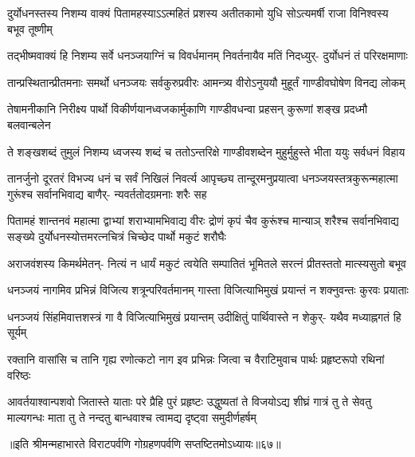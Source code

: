 
\fourlineindentedshloka
{दुर्योधनस्तस्य निशम्य वाक्यं}
{पितामहस्याऽऽत्महितं प्रशस्य}
{अतीतकामो युधि सोऽत्यमर्षी}
{राजा विनिश्वस्य बभूव तूष्णीम्}


\fourlineindentedshloka
{तद्भीष्मवाक्यं हि निशम्य सर्वे}
{धनञ्जयाग्निं च विवर्धमानम्}
{निवर्तनायैव मतिं निदध्युर्-}
{दुर्योधनं तं परिरक्षमाणाः}


\fourlineindentedshloka
{तान्प्रस्थितान्प्रीतमनाः समर्थो}
{धनञ्जयः सर्वकुरुप्रवीरः}
{आमन्त्र्य वीरोऽनुययौ मुहूर्तं}
{गाण्डीवघोषेण विनद्य लोकम्}


\fourlineindentedshloka
{तेषामनीकानि निरीक्ष्य पार्थो}
{विकीर्णयानध्वजकार्मुकाणि}
{गाण्डीवधन्वा प्रहसन् कुरूणां}
{शङ्ख प्रदध्मौ बलवान्बलेन}


\fourlineindentedshloka
{ते शङ्खशब्दं तुमुलं निशम्य}
{ध्वजस्य शब्दं च ततोऽन्तरिक्षे}
{गाण्डीवशब्देन मुहुर्मुहुस्ते}
{भीता ययुः सर्वधनं विहाय}


\sixlineindentedshloka
{तानर्जुनो दूरतरं विभज्य}
{धनं च सर्वं निखिलं निवर्त्य}
{आपृच्छ्य तान्दूरमनुप्रयात्वा}
{धनञ्जयस्तत्रकुरून्महात्मा}
{गुरूंश्च सर्वानभिवाद्य बाणैर्-}
{न्यवर्ततोदग्रमनाः शरैः सह}


\sixlineindentedshloka
{पितामहं शान्तनवं महात्मा}
{द्वाभ्यां शराभ्यामभिवाद्य वीरः}
{द्रोणं कृपं चैव कुरूंश्च मान्याञ्}
{शरैश्च सर्वानभिवाद्य सङ्ख्ये}
{दुर्योधनस्योत्तमरत्नचित्रं}
{चिच्छेद पार्थो मकुटं शरौघैः}


\fourlineindentedshloka
{अराजवंशस्य किमर्थमेतन्-}
{नित्यं न धार्यं मकुटं त्वयेति}
{सम्पातितं भूमितले सरत्नं}
{प्रीतस्ततो मात्स्यसुतो बभूव}


\fourlineindentedshloka
{धनञ्जयं नागमिव प्रभिन्नं}
{विजित्य शत्रून्परिवर्तमानम्}
{गास्ता विजित्याभिमुखं प्रयान्तं}
{न शक्नुवन्तः कुरवः प्रयाताः}


\fourlineindentedshloka
{धनञ्जयं सिंहमिवात्तशस्त्रं}
{गा वै विजित्याभिमुखं प्रयान्तम्}
{उदीक्षितुं पार्थिवास्ते न शेकुर्-}
{यथैव मध्याह्नगतं हि सूर्यम्}


\fourlineindentedshloka
{रक्तानि वासांसि च तानि गृह्य}
{रणोत्कटो नाग इव प्रभिन्नः}
{जित्वा च वैराटिमुवाच पार्थः}
{प्रहृष्टरूपो रथिनां वरिष्ठः}


\sixlineindentedshloka
{आवर्तयाश्वान्पशवो जितास्ते}
{याताः परे प्रैहि पुरं प्रहृष्टः}
{उद्धुष्यतां ते विजयोऽद्य शीघ्रं}
{गात्रं तु ते सेवतु माल्यगन्धः}
{माता तु ते नन्दतु बान्धवाश्च}
{त्वामद्य दृष्ट्वा समुदीर्णहर्षम्}

॥इति श्रीमन्महाभारते विराटपर्वणि गोग्रहणपर्वणि सप्तष्टितमोऽध्यायः॥६७॥

